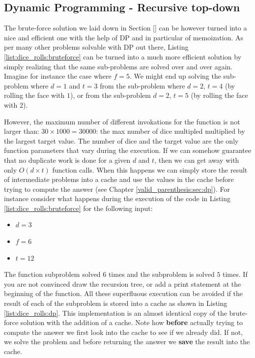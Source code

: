 \subsection{Dynamic Programming - Recursive top-down}
\label{dice_rolls:sec:DP}
The brute-force solution we laid down in Section \ref{} can be however turned into a nice and efficient one with the help of DP and in particular of memoization.
As per many other problems solvable with DP out there, 
Listing \ref{list:dice_rolls:bruteforce} can be turned into a much more efficient solution
by simply realizing that the same sub-problems are solved over and over again.
Imagine for instance the case where $f=5$. We might end up solving the sub-problem where $d=1$ and $t=3$  from the sub-problem where $d=2$, $t=4$ (by rolling the face with $1$), or from the sub-problem $d=2$, $t=5$ (by rolling the face with $2$).

However, the maximum number of different invokations for the function 
is not larger than: $30\times 1000 = 30000$: the max number of dice multipled  multiplied by the largest target value. The number of dice and the target value are the only function parameters that vary during the execution.
If we can somehow guarantee that no duplicate work is done for a given $d$ and $t$, then we can get away with only $O(d\times t)$ function calls. 
When this happens we can simply store the result of intermediate problems into a cache and use the values in the cache before trying to compute the answer (see Chapter \ref{valid_parenthesis:sec:dp}). 
For instance consider what happens during the execution of the code in Listing \ref{list:dice_rolls:bruteforce} for the following input:
\begin{itemize}
	\item $d = 3$
	\item $f = 6$
	\item $t = 12$
\end{itemize}

The function subproblem  solved $6$ times and the subproblem  is solved $5$ times. If you are not convinced draw the recursion tree, or add a print statement at the beginning of the function. All these superfluous execution can be avoided if the result of each of the subproblem is stored into a cache as shown in Listing \ref{list:dice_rolls:dp}. This implementation is an almost identical copy of the brute-force solution with the addition of a cache. Note how \textbf{before} actually trying to compute the answer we first look into the cache to see if we already did. If not, we solve the problem and before returning the answer we \textbf{save} the result into the cache.



